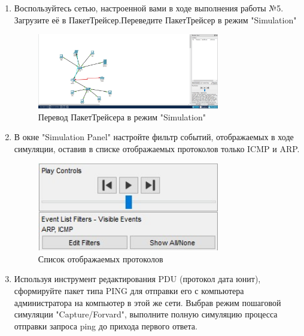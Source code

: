 \documentclass[bachelor, och, labwork]{shiza}
\begin{document}


\begin{enumerate}
    
    \item Воспользуйтесь сетью, настроенной вами в ходе выполнения работы №5.  Загрузите её 
    в ПакетТрейсер.Переведите ПакетТрейсер в режим "Simulation"
    
    
    \begin{figure}[H]
        \centering      %
        \includegraphics[width=0.75\textwidth]{1}
        \caption{Перевод ПакетТрейсера в режим "Simulation"}
        \label{fig:image1}
    \end{figure}

    \item В окне "Simulation Panel" настройте фильтр событий, отображаемых в ходе симуляции, оставив в списке 
    отображаемых протоколов только ICMP и ARP.

    \begin{figure}[H]
        \centering      %
        \includegraphics[width=0.75\textwidth]{2}
        \caption{Список отображаемых протоколов}
        \label{fig:image1}
    \end{figure}

    \item Используя инструмент редактирования PDU (протокол дата юнит), сформируйте пакет типа PING для 
    отправки его с компьютера администратора на компьютер в этой же сети. Выбрав режим пошаговой 
    симуляции "Capture/Forvard", выполните полную симуляцию процесса отправки запроса ping до прихода 
    первого ответа.


\end{enumerate}
\end{document}

